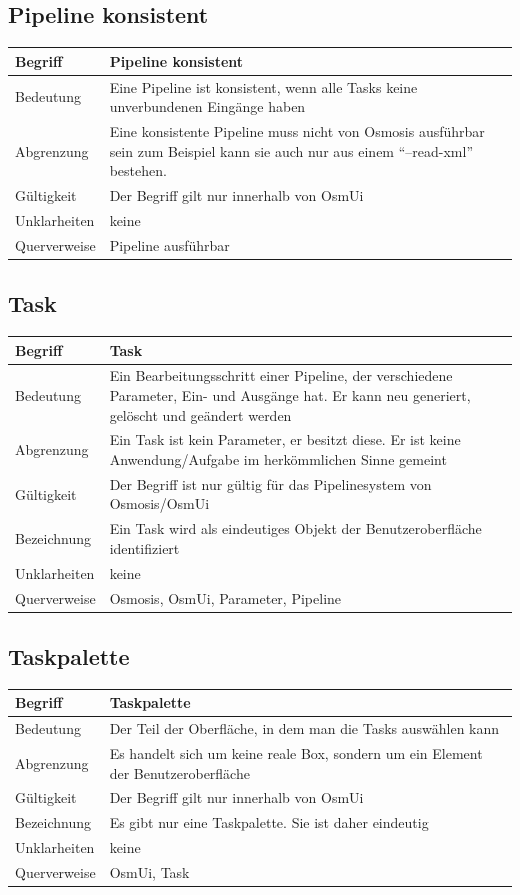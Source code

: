 \documentclass[a4paper,12pt]{scrartcl}
\begin{document}
\begin{center}
\subsection{Pipeline konsistent}
\begin{tabular}{|p{5cm}|p{10cm}|}
\hline Begriff & \textbf{Pipeline konsistent} \\ 
\hline Bedeutung & Eine Pipeline ist konsistent, wenn alle Tasks keine unverbundenen Eingänge haben \\ 
\hline Abgrenzung & Eine konsistente Pipeline muss nicht von Osmosis ausführbar sein
\newline zum Beispiel kann sie auch nur aus einem ``--read-xml'' bestehen. \\ 
\hline Gültigkeit & Der Begriff gilt nur innerhalb von OsmUi \\  
\hline Unklarheiten & keine \\ 
\hline Querverweise & Pipeline ausführbar \\ 
\hline 
\end{tabular}
\subsection{Task}
\begin{tabular}{|p{5cm}|p{10cm}|}
\hline Begriff & \textbf{Task} \\ 
\hline Bedeutung & Ein Bearbeitungsschritt einer Pipeline, der verschiedene Parameter, Ein- und Ausgänge hat. Er kann neu generiert, gelöscht und geändert werden\\ 
\hline Abgrenzung & Ein Task ist kein Parameter, er besitzt diese. Er ist keine Anwendung/Aufgabe im herkömmlichen Sinne gemeint\\ 
\hline Gültigkeit & Der Begriff ist nur gültig für das Pipelinesystem von Osmosis/OsmUi\\ 
\hline Bezeichnung & Ein Task wird als eindeutiges Objekt der Benutzeroberfläche identifiziert\\ 
\hline Unklarheiten & keine \\ 
\hline Querverweise & Osmosis, OsmUi, Parameter, Pipeline\\ 
\hline 
\end{tabular}
\subsection{Taskpalette}
\begin{tabular}{|p{5cm}|p{10cm}|}
\hline Begriff & \textbf{Taskpalette} \\ 
\hline Bedeutung & Der Teil der Oberfläche, in dem man die Tasks auswählen kann  \\ 
\hline Abgrenzung & Es handelt sich um keine reale Box, sondern um ein Element der Benutzeroberfläche\\ 
\hline Gültigkeit & Der Begriff gilt nur innerhalb von OsmUi \\ 
\hline Bezeichnung & Es gibt nur eine Taskpalette. Sie ist daher eindeutig \\ 
\hline Unklarheiten & keine \\ 
\hline Querverweise & OsmUi, Task\\ 
\hline 
\end{tabular}
\end{center}
\end{document}
